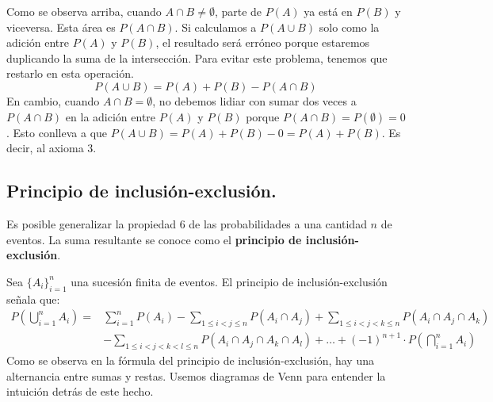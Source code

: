 \documentclass[12pt]{article}
\begin{document}
\newpage

\begin{figure}[hbt!]
\centering


\end{figure}

Como se observa arriba, cuando $A \cap B \neq \emptyset$, parte de $P(A)$ ya está en $P(B)$ y viceversa. Esta área es $P(A \cap B)$. Si calculamos a $P(A \cup B)$ solo como la adición entre $P(A)$ y $P(B)$, el resultado será erróneo porque estaremos duplicando la suma de la intersección. Para evitar este problema, tenemos que restarlo en esta operación.
\[
  P(A \cup B) = P(A) + P(B) - P(A \cap B)
\]
En cambio, cuando $A \cap B = \emptyset$, no debemos lidiar con sumar dos veces a $P(A \cap B)$ en la adición entre $P(A)$ y $P(B)$ porque $P(A \cap B) = P(\emptyset) = 0$. Esto conlleva a que $P(A \cup B) = P(A) + P(B) - 0 = P(A) + P(B)$. Es decir, al axioma 3.


\subsection{Principio de inclusión-exclusión.}

Es posible generalizar la propiedad 6 de las probabilidades a una cantidad $n$ de eventos. La suma resultante se conoce como el \textbf{principio de inclusión-exclusión}.

Sea $\{A_{i}\}_{i = 1}^{n}$ una sucesión finita de eventos. El principio de inclusión-exclusión señala que:
\begin{align*}
  P\left(\bigcup_{i = 1}^{n} A_{i}\right) = &\sum_{i = 1}^{n} P(A_{i}) - \sum_{1 \leq i < j \leq n} P(A_{i} \cap A_{j})
                                            + \sum_{1 \leq i < j < k \leq n} P(A_{i} \cap A_{j} \cap A_{k}) \\
                                            & - \sum_{1\leq i < j < k < l \leq n} P(A_{i} \cap A_{j} \cap A_{k} \cap A_{l})
                                            + \ldots + (-1)^{n + 1} \cdot P\left(\bigcap_{i = 1}^{n} A_{i}\right)
\end{align*}
Como se observa en la fórmula del principio de inclusión-exclusión, hay una alternancia entre sumas y restas. Usemos diagramas de Venn para entender la intuición detrás de este hecho.
\end{document}

